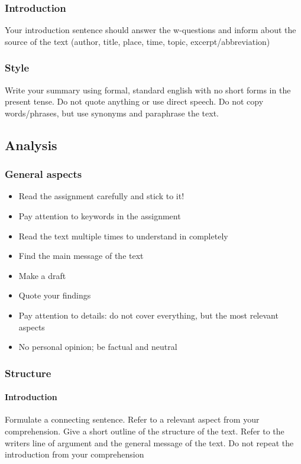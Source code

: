 \documentclass{article}
\begin{document}
	\subsubsection*{Introduction}
	Your introduction sentence should answer the w-questions and inform about the source of the text (author, title, place, time, topic, excerpt/abbreviation)

	\subsubsection{Style}
	Write your summary using formal, standard english with no short forms in the present tense. Do not quote anything or use direct speech. Do not copy words/phrases, but use synonyms and paraphrase the text. 

	\subsection{Analysis}
	\subsubsection{General aspects}
	\begin{itemize}
		\item Read the assignment carefully and stick to it!
		\item Pay attention to keywords in the assignment
		\item Read the text multiple times to understand in completely
		\item Find the main message of the text
		\item Make a draft
		\item Quote your findings
		\item Pay attention to details: do not cover everything, but the most relevant aspects
		\item No personal opinion; be factual and neutral
	\end{itemize}

	\subsubsection{Structure}
	\paragraph{Introduction}
	Formulate a connecting sentence. Refer to a relevant aspect from your comprehension.
	Give a short outline of the structure of the text. Refer to the writers line of argument and the general message of the text. Do not repeat the introduction from your comprehension
\end{document}
